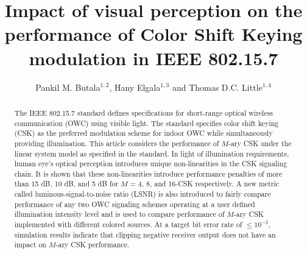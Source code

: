 \documentclass[10pt,letterpaper]{article}
\begin{document}
\title{Impact of visual perception on the performance of Color Shift Keying modulation in IEEE 802.15.7}

\author{Pankil M. Butala$^{1,2}$, Hany Elgala$^{1,3}$ and Thomas D.C. Little$^{1,4}$}

\address{$^{1}$Multimedia Communication Laboratory and Smart Lighting Engineering Research Center\\
Boston University, Boston, MA 02215, USA\\
\{$^2$pbutala,$^3$helgala,$^4$tdcl\}@bu.edu}



\begin{abstract}
The IEEE 802.15.7 standard defines specifications for short-range optical wireless communication (OWC) using visible light. The standard specifies color shift keying (CSK) as the preferred modulation scheme for indoor OWC while simultaneously providing illumination. This article considers the performance of $M$-ary CSK under the linear system model as specified in the standard. In light of illumination requirements, human eye's optical perception introduces unique non-linearities in the CSK signaling chain. It is shown that these non-linearities introduce performance penalties of more than 15 dB, 10 dB, and 5 dB for $M$ = 4, 8, and 16-CSK respectively. A new metric called luminous-signal-to-noise ratio (LSNR) is also introduced to fairly compare performance of any two OWC signaling schemes operating at a user defined illumination intensity level and is used to compare performance of $M$-ary CSK implemented with different colored sources. At a target bit error rate of $\leq 10^{-3}$, simulation results indicate that clipping negative receiver output does not have an impact on $M$-ary CSK performance.
\end{abstract}

\end{document}
